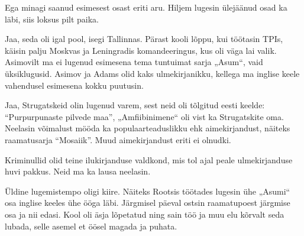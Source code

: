 
Ega minagi saanud esimesest osast eriti aru. Hiljem lugesin ülejäänud osad ka läbi, siis loksus 
pilt paika.


Jaa, seda oli igal pool, isegi Tallinnas. 
Pärast kooli lõppu, kui töötasin TPIs, 
käisin palju Moskvas ja Leningradis komandeeringus, kus oli väga 
lai valik. Asimovilt ma ei lugenud esimesena tema tuntuimat sarja „Asum“, vaid 
üksiklugusid. Asimov ja Adams olid kaks ulmekirjanikku, 
kellega ma inglise keele vahendusel esimesena kokku puutusin. 


Jaa, Strugatskeid olin lugenud varem, sest neid oli tõlgitud eesti keelde: 
\enquote{Purpurpunaste pilvede maa}\label{sisu:purpur}, „Amfiibinimene“ oli vist ka 
Strugatskite oma. Neelasin võimalust mööda ka populaarteaduslikku ehk 
aimekirjandust, näiteks raamatusarja \enquote{Mosaiik}. Muud
aimekirjandust eriti ei olnudki.

Kriminullid olid teine ilukirjanduse valdkond, mis tol ajal peale ulmekirjanduse 
huvi pakkus. Neid ma ka lausa neelasin.

Üldine lugemistempo oligi kiire. Näiteks Rootsis töötades lugesin ühe „Asumi“ osa 
inglise keeles ühe ööga läbi. Järgmisel päeval ostsin raamatupoest järgmise osa ja nii edasi. Kool oli äsja lõpetatud ning sain töö ja muu 
elu kõrvalt seda lubada, selle asemel et öösel magada ja puhata.

